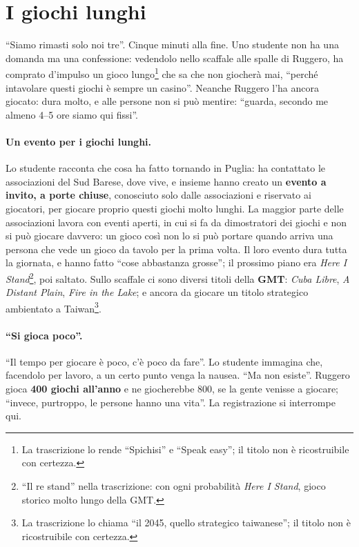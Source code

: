 \section{I giochi lunghi}
\label{a8:sec:lunghi}

``Siamo rimasti solo noi tre''. Cinque minuti alla fine. Uno studente non ha una domanda
ma una confessione: vedendolo nello scaffale alle spalle di Ruggero, ha comprato
d'impulso un gioco lungo\footnote{La trascrizione lo rende ``Spichisi'' e ``Speak
easy''; il titolo non è ricostruibile con certezza.} che sa che non giocherà mai,
``perché intavolare questi giochi è sempre un casino''. Neanche Ruggero l'ha ancora
giocato: dura molto, e alle persone non si può mentire: ``guarda, secondo me almeno 4--5
ore siamo qui fissi''.

\paragraph{Un evento per i giochi lunghi.} Lo studente racconta che cosa ha fatto
tornando in Puglia: ha contattato le associazioni del Sud Barese, dove vive, e insieme
hanno creato un \textbf{evento a invito, a porte chiuse}, conosciuto solo dalle
associazioni e riservato ai giocatori, per giocare proprio questi giochi molto lunghi.
La maggior parte delle associazioni lavora con eventi aperti, in cui si fa da
dimostratori dei giochi e non si può giocare davvero: un gioco così non lo si può
portare quando arriva una persona che vede un gioco da tavolo per la prima volta. Il
loro evento dura tutta la giornata, e hanno fatto ``cose abbastanza grosse''; il
prossimo piano era \emph{Here I Stand}\footnote{``Il re stand'' nella trascrizione:
con ogni probabilità \emph{Here I Stand}, gioco storico molto lungo della GMT.}, poi
saltato. Sullo scaffale ci sono diversi titoli della \textbf{GMT}: \emph{Cuba Libre},
\emph{A Distant Plain}, \emph{Fire in the Lake}; e ancora da giocare un titolo
strategico ambientato a Taiwan\footnote{La trascrizione lo chiama ``il 2045, quello
strategico taiwanese''; il titolo non è ricostruibile con certezza.}.

\paragraph{``Si gioca poco''.} ``Il tempo per giocare è poco, c'è poco da fare''. Lo
studente immagina che, facendolo per lavoro, a un certo punto venga la nausea. ``Ma non
esiste''. Ruggero gioca \textbf{400 giochi all'anno} e ne giocherebbe 800, se la gente
venisse a giocare; ``invece, purtroppo, le persone hanno una vita''. La registrazione
si interrompe qui.

